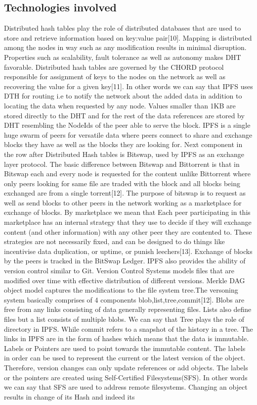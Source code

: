 \documentclass[12pt]{article}
\begin{document}
\subsection{Technologies involved}
Distributed hash tables play the role of distributed databases that are used to store and retrieve information based on key:value pair[10]. Mapping is distributed among the nodes in way such as any modification results in minimal disruption. Properties such as scalability, fault tolerance as well as autonomy makes DHT favorable. Distributed hash tables are governed by the CHORD protocol responsible for assignment of keys to the nodes on the network as well as recovering the value for a given key[11]. In other words we can say that  IPFS uses DTH for routing i.e to notify the network about the added data in addition to locating the data when requested by any node. Values smaller than 1KB are stored directly to the DHT and for the rest of the data references are stored by DHT resembling the NodeIds of the peer able to serve the block. IPFS is a single huge swarm of peers for versatile data where peers connect to share and exchange blocks they have as well as the blocks they are looking for. Next component in the row after Distributed Hash tables is Bitswap, used by IPFS as an exchange layer protocol. The basic difference between Bitswap and Bittorrent is that in Bitswap each and every node is requested for the content unlike Bittorrent where only peers looking for same file are traded with the block and all blocks being exchanged are from a single torrent[12]. The purpose of bitswap is to request as well as send blocks to other peers in the network working as a marketplace for exchange of blocks. By marketplace we mean that Each peer participating in this marketplace has an internal strategy that they use to decide if they will exchange content (and other information) with any other peer they are contented to. These strategies are not necessarily fixed, and can be designed to do things like incentivise data duplication, or uptime, or punish leechers[13]. Exchange of blocks by the peers is tracked in the BitSwap Ledger. IPFS also provides the ability of version control similar to Git. Version Control Systems models files that are modified over time with effective distribution of different versions. Merkle DAG object model captures the modifications to the file system tree.The versoning system basically comprises of 4 components blob,list,tree,commit[12]. Blobs are free from any links consisting of data generally representing files. Lists also define files but a list consists of multiple blobs. We can say that Tree plays the role of directory in IPFS. While commit refers to a snapshot of the history in a tree. The links in IPFS are in the form of hashes which means that the data is immutable. Labels or Pointers are used to point towards the immutable content. The labels in order can be used to represent the current or the latest version of the object. Therefore, version changes can only update references or add objects. The labels or the pointers are created using Self-Certified Filesystems(SFS). In other words we can say that SFS are used to address remote filesystems.     Changing an object results in change of its Hash and indeed its 
\end{document}
